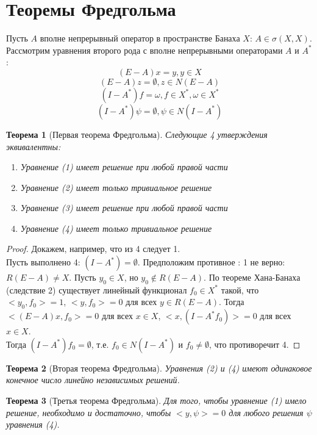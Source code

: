 \documentclass[12pt,a4paper,titlepage, oneside]{book}
\theoremstyle{definition}
\theoremstyle{plain}
\newtheorem*{theorem}{Теорема}
\theoremstyle{remark}
\theoremstyle{remark}
\theoremstyle{remark}
\theoremstyle{remark}
\theoremstyle{plain}
\theoremstyle{plain}
\begin{document}
\section{Теоремы Фредгольма}
Пусть $A$ вполне непрерывный оператор в пространстве Банаха $X$: $A \in \sigma(X,X)$. Рассмотрим уравнения второго рода с вполне непрерывными операторами $A$ и $A^*$:
\begin{equation}
(E - A)x=y , y \in X
\end{equation}
\begin{equation}
(E - A)z=\emptyset, z \in N(E-A)
\end{equation}
\begin{equation}
(I - A^*)f=\omega , f \in X^*, \omega \in X^* 
\end{equation}
\begin{equation}
(I - A^*)\psi=\emptyset, \psi \in N(I - A^*)
\end{equation}
\begin{theorem}[Первая теорема Фредгольма]
Следующие 4 утверждения эквивалентны:
\begin{enumerate}
\item Уравнение (1) имеет решение при любой правой части
\item Уравнение (2) имеет только тривиальное решение
\item Уравнение (3) имеет решение при любой правой части
\item Уравнение (4) имеет только тривиальное решение
\end{enumerate}
\end{theorem}
\begin{proof}
Докажем, например, что из 4 следует 1.\\
Пусть выполнено 4: $(I - A^*)=\emptyset$. Предположим противное : 1 не верно: $R(E - A)\neq X$. Пусть $y_0 \in X$, но $y_0 \not \in R(E - A)$. По теореме Хана-Банаха (следствие 2) существует линейный функционал $f_0 \in X^*$ такой, что $<y_0,f_0>=1$, $<y,f_0>=0$ для всех $y \in R(E-A)$. Тогда $<(E-A)x,f_0>=0$ для всех $x \in X$, $<x,(I-A^*f_0)>=0$ для всех $x \in X$.\\
Тогда $(I-A^*)f_0=\emptyset$, т.е. $f_0 \in N(I-A^*)$ и $f_0 \neq \emptyset$, что противоречит 4.
\end{proof}
\begin{theorem}[Вторая теорема Фредгольма]
Уравнения (2) и (4) имеют одинаковое конечное число линейно независимых решений.
\end{theorem}
\begin{theorem}[Третья теорема Фредгольма]
Для того, чтобы уравнение (1) имело решение, необходимо и достаточно, чтобы $<y,\psi>=0$ для любого решения $\psi$ уравнения (4).
\end{theorem}
\end{document}
